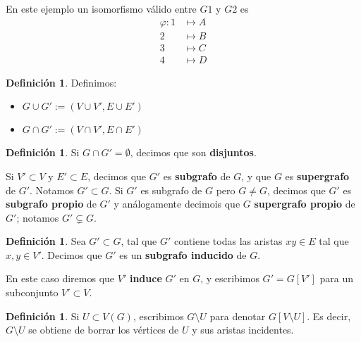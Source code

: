 \documentclass[12pt]{report}
\theoremstyle{plain}
\theoremstyle{definition}
\newtheorem{definition}[theorem]{Definición}
\begin{document}
En este ejemplo un isomorfismo válido entre $G1$ y $G2$ es
\begin{align*}
\varphi : 1 &\mapsto A \\
			2 &\mapsto B \\
			3 &\mapsto C \\
			4 &\mapsto D
\end{align*}


\begin{definition}
Definimos:
\begin{itemize}
\item $G \cup G' := (V \cup V', E \cup E')$
\item $G \cap G' := (V \cap V' , E \cap E')$
\end{itemize}
\end{definition}


\begin{definition}
Si $G \cap G' = \emptyset$, decimos que son \textbf{disjuntos}.

Si $V' \subset V$ y $E' \subset E$, decimos que $G'$ es \textbf{subgrafo} de $G$, y que $G$ es \textbf{supergrafo} de $G'$. Notamos $G' \subset G$. Si $G'$ es subgrafo de $G$ pero $G \neq G$, decimos que $G'$ es \textbf{subgrafo propio} de $G'$ y análogamente decimois que $G$ \textbf{supergrafo propio} de $G'$; notamos $G' \subsetneq G$.
\end{definition}

\begin{definition}
Sea $G' \subset G$, tal que $G'$ contiene todas las aristas $xy \in E$ tal que $x,y \in V'$. Decimos que $G'$ es un \textbf{subgrafo inducido} de $G$.

En este caso diremos que $V'$ \textbf{induce} $G'$ en $G$, y escribimos $G' = G[V']$ para un subconjunto $V' \subset V$.
\end{definition}









\begin{definition}
Si $U \subset V(G)$, escribimos $G \setminus U$ para denotar $G[V \setminus U]$. Es decir, $G \setminus U$ se obtiene de borrar los vértices de $U$ y sus aristas incidentes.
\end{definition}
\end{document}
